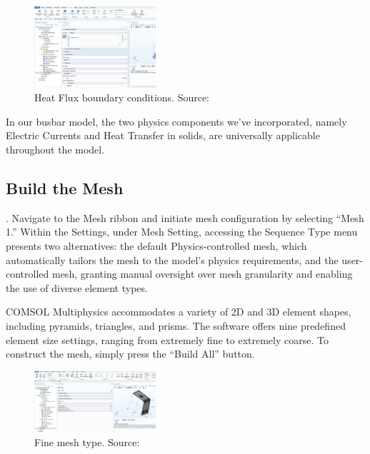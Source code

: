 \begin{figure}[ht!]
  \centering
  \includegraphics[width=0.4\textwidth]{Chapters/Figures/Chapter 3 Figures/Heat Flux Boundary Conditions.png}
  \caption{Heat Flux boundary conditions. Source: \cite{multiphysics__modeling_nodate}}
  \label{fig:Heat Flux boundary conditions.}
\end{figure}

In our busbar model, the two physics components we've incorporated, namely Electric Currents and Heat Transfer in solids, are universally applicable throughout the model.

\subsection{Build the Mesh}.
Navigate to the Mesh ribbon and initiate mesh configuration by selecting ``Mesh 1.'' Within the Settings, under Mesh Setting, accessing the Sequence Type menu presents two alternatives: the default Physics-controlled mesh, which automatically tailors the mesh to the model's physics requirements, and the user-controlled mesh, granting manual oversight over mesh granularity and enabling the use of diverse element types.

COMSOL Multiphysics accommodates a variety of 2D and 3D element shapes, including pyramids, triangles, and prisms. The software offers nine predefined element size settings, ranging from extremely fine to extremely coarse. To construct the mesh, simply press the ``Build All'' button.

\begin{figure}[ht!]
  \centering
  \includegraphics[width=0.4\textwidth]{Chapters/Figures/Chapter 3 Figures/Fine Mesh.png}
  \caption{Fine mesh type. Source: \cite{multiphysics__modeling_nodate}}
  \label{fig:Fine mesh type.}
\end{figure}

